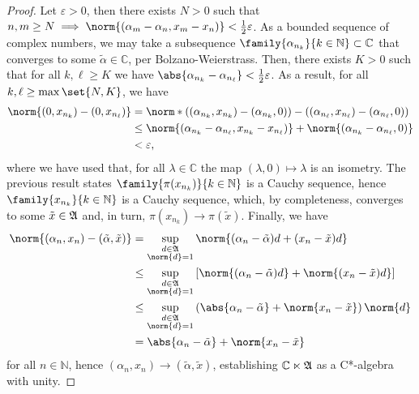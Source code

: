 \begin{proof}
    Let \(\varepsilon > 0\), then there exists \(N > 0\) such that \(n, m \geq N \implies \norm{(\alpha_m - \alpha_n, x_m - x_n)} < \frac12 \varepsilon\). As a bounded sequence of complex numbers, we may take a subsequence \(\family{\alpha_{n_k}}{k\in \mathbb{N}} \subset \mathbb{C}\) that converges to some \(\tilde{\alpha} \in \mathbb{C}\), per Bolzano-Weierstrass. Then, there exists \(K > 0\) such that for all \(k, \ell \geq K\) we have \(\abs{\alpha_{n_k} - \alpha_{n_\ell}} < \frac12 \varepsilon\). As a result, for all \(k, \ell \geq \max{\set{N, K}}\), we have
    \begin{align*}
        \norm{(0, x_{n_k}) - (0, x_{n_\ell})} &= \norm*{\left((\alpha_{n_k}, x_{n_k}) - (\alpha_{n_k}, 0)\right) - \left((\alpha_{n_\ell}, x_{n_\ell}) - (\alpha_{n_\ell}, 0)\right)}\\
                                              &\leq \norm{(\alpha_{n_k} - \alpha_{n_\ell}, x_{n_k} - x_{n_\ell})} + \norm{(\alpha_{n_k} - \alpha_{n_\ell}, 0)}\\
                                              &< \varepsilon,
    \end{align*}
    where we have used that, for all \(\lambda \in \mathbb{C}\) the map \((\lambda,0) \mapsto \lambda\) is an isometry. The previous result states \(\family{\pi(x_{n_k})}{k \in \mathbb{N}}\) is a Cauchy sequence, hence \(\family{x_{n_k}}{k \in \mathbb{N}}\) is a Cauchy sequence, which, by completeness, converges to some \(\tilde{x} \in \mathfrak{A}\) and, in turn, \(\pi(x_{n_k}) \to \pi(\tilde{x})\). Finally, we have
    \begin{align*}
        \norm{(\alpha_n, x_n) - (\tilde{\alpha}, \tilde{x})} &= \sup_{\substack{d\in\algebra{A}\\\norm{d}=1}}{\norm{(\alpha_n - \tilde{\alpha})d + (x_n - \tilde{x})d}}\\
                                                             &\leq \sup_{\substack{d\in\algebra{A}\\\norm{d}=1}}{\left[\norm{(\alpha_n - \tilde{\alpha})d} + \norm{(x_n - \tilde{x})d}\right]}\\
                                                             &\leq \sup_{\substack{d\in\algebra{A}\\\norm{d}=1}}{\left(\abs{\alpha_n - \tilde{\alpha}} + \norm{x_n - \tilde{x}}\right)\norm{d}}\\
                                                             &=\abs{\alpha_n - \tilde{\alpha}} + \norm{x_n - \tilde{x}}
    \end{align*}
    for all \(n \in \mathbb{N}\), hence \((\alpha_n, x_n) \to (\tilde{\alpha}, \tilde{x})\), establishing \(\mathbb{C} \ltimes \mathfrak{A}\) as a C*-algebra with unity.
\end{proof}

